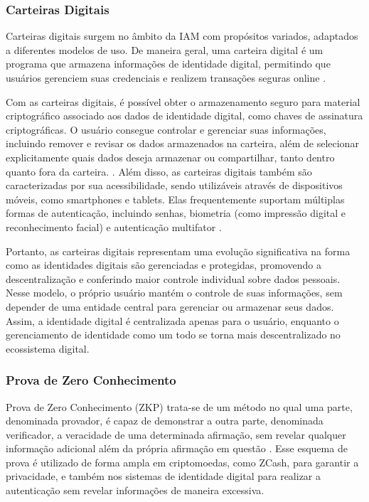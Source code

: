 \subsubsection{Carteiras Digitais}\label{subsection:carteira-digital}

Carteiras digitais surgem no âmbito da \acs{IAM} com propósitos variados, adaptados a diferentes modelos de uso. De maneira geral, uma carteira digital é um programa que armazena informações de identidade digital, permitindo que usuários gerenciem suas credenciais e realizem transações seguras online \cite{digital_identity_wallet_benefits_and_risks}. 

Com as carteiras digitais, é possível obter o armazenamento seguro para material criptográfico associado aos dados de identidade digital, como chaves de assinatura criptográficas. O usuário consegue controlar e gerenciar suas informações, incluindo remover e revisar os dados armazenados na carteira, além de selecionar explicitamente quais dados deseja armazenar ou compartilhar, tanto dentro quanto fora da carteira. \cite{podgorelec2024digital}. Além disso, as carteiras digitais também são caracterizadas por sua acessibilidade, sendo utilizáveis através de dispositivos móveis, como smartphones e tablets. Elas frequentemente suportam múltiplas formas de autenticação, incluindo senhas, biometria (como impressão digital e reconhecimento facial) e autenticação multifator \cite{future_of_digital_wallets_and_identity_management}.

Portanto, as carteiras digitais representam uma evolução significativa na forma como as identidades digitais são gerenciadas e protegidas, promovendo a descentralização e conferindo maior controle individual sobre dados pessoais. Nesse modelo, o próprio usuário mantém o controle de suas informações, sem depender de uma entidade central para gerenciar ou armazenar seus dados. Assim, a identidade digital é centralizada apenas para o usuário, enquanto o gerenciamento de identidade como um todo se torna mais descentralizado no ecossistema digital.


\subsubsection{Prova de Zero Conhecimento}\label{section:zkp}

Prova de Zero Conhecimento (\acs{ZKP}) trata-se de um método no qual uma parte, denominada provador, é capaz de demonstrar a outra parte, denominada verificador, a veracidade de uma determinada afirmação, sem revelar qualquer informação adicional além da própria afirmação em questão \cite{petkus2019zkSNARK}. Esse esquema de prova é utilizado de forma ampla em criptomoedas, como ZCash, para garantir a privacidade, e também nos sistemas de identidade digital para realizar a autenticação sem revelar informações de maneira excessiva.

